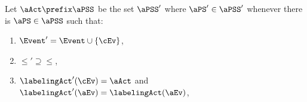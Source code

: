 \begin{definition}
  \label{def:prefix}
Let $\aAct \prefix \aPSS$ be the set $\aPSS'$ where $\aPS'\in\aPSS'$ whenever
there is $\aPS\in\aPSS$ such that:
\begin{enumerate}
\item\label{pre-E} $\Event' = \Event \cup \{\cEv\}$,
\item\label{pre-le} ${\le'}\supseteq{\le}$, %
\item\label{pre-act} $\labelingAct'(\cEv) = \aAct$ and $\labelingAct'(\aEv) = \labelingAct(\aEv)$,

\end{enumerate}
\end{definition}
